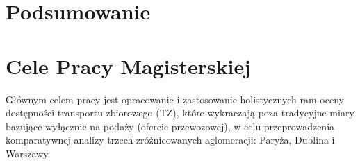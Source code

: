 \documentclass[12pt]{article}
\begin{document}

\section*{Podsumowanie}

\section*{Cele Pracy Magisterskiej}
Głównym celem pracy jest opracowanie i zastosowanie holistycznych ram oceny dostępności transportu zbiorowego (TZ), które wykraczają poza tradycyjne miary bazujące wyłącznie na podaży (ofercie przewozowej), w celu przeprowadzenia komparatywnej analizy trzech zróżnicowanych aglomeracji: Paryża, Dublina i Warszawy.
\end{document}
